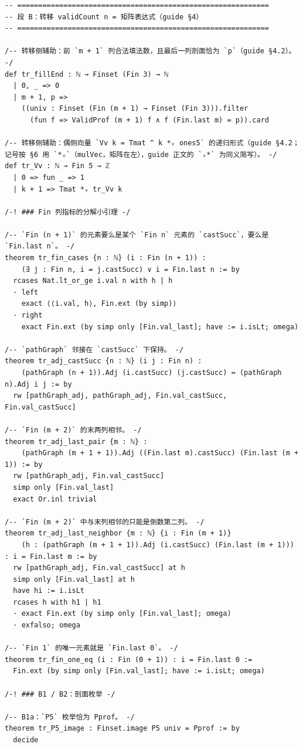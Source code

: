 \documentclass[11pt]{article}
\begin{document}
\begin{lstlisting}
-- ============================================================
-- 段 B：转移 validCount n = 矩阵表达式（guide §4）
-- ============================================================

/-- 转移侧辅助：前 `m + 1` 列合法填法数，且最后一列剖面恰为 `p`（guide §4.2）。 -/
def tr_fillEnd : ℕ → Finset (Fin 3) → ℕ
  | 0, _ => 0
  | m + 1, p =>
    ((univ : Finset (Fin (m + 1) → Finset (Fin 3))).filter
      (fun f => ValidProf (m + 1) f ∧ f (Fin.last m) = p)).card

/-- 转移侧辅助：偶侧向量 `Vv k = Tmat ^ k *ᵥ ones5` 的递归形式（guide §4.2；
记号按 §6 用 `*ᵥ`（mulVec，矩阵在左），guide 正文的 `ᵥ*` 为同义简写）。 -/
def tr_Vv : ℕ → Fin 5 → ℤ
  | 0 => fun _ => 1
  | k + 1 => Tmat *ᵥ tr_Vv k

/-! ### Fin 列指标的分解小引理 -/

/-- `Fin (n + 1)` 的元素要么是某个 `Fin n` 元素的 `castSucc`，要么是 `Fin.last n`。 -/
theorem tr_fin_cases {n : ℕ} (i : Fin (n + 1)) :
    (∃ j : Fin n, i = j.castSucc) ∨ i = Fin.last n := by
  rcases Nat.lt_or_ge i.val n with h | h
  · left
    exact ⟨⟨i.val, h⟩, Fin.ext (by simp)⟩
  · right
    exact Fin.ext (by simp only [Fin.val_last]; have := i.isLt; omega)

/-- `pathGraph` 邻接在 `castSucc` 下保持。 -/
theorem tr_adj_castSucc {n : ℕ} (i j : Fin n) :
    (pathGraph (n + 1)).Adj (i.castSucc) (j.castSucc) ↔ (pathGraph n).Adj i j := by
  rw [pathGraph_adj, pathGraph_adj, Fin.val_castSucc, Fin.val_castSucc]

/-- `Fin (m + 2)` 的末两列相邻。 -/
theorem tr_adj_last_pair {m : ℕ} :
    (pathGraph (m + 1 + 1)).Adj ((Fin.last m).castSucc) (Fin.last (m + 1)) := by
  rw [pathGraph_adj, Fin.val_castSucc]
  simp only [Fin.val_last]
  exact Or.inl trivial

/-- `Fin (m + 2)` 中与末列相邻的只能是倒数第二列。 -/
theorem tr_adj_last_neighbor {m : ℕ} {i : Fin (m + 1)}
    (h : (pathGraph (m + 1 + 1)).Adj (i.castSucc) (Fin.last (m + 1))) : i = Fin.last m := by
  rw [pathGraph_adj, Fin.val_castSucc] at h
  simp only [Fin.val_last] at h
  have hi := i.isLt
  rcases h with h1 | h1
  · exact Fin.ext (by simp only [Fin.val_last]; omega)
  · exfalso; omega

/-- `Fin 1` 的唯一元素就是 `Fin.last 0`。 -/
theorem tr_fin_one_eq (i : Fin (0 + 1)) : i = Fin.last 0 :=
  Fin.ext (by simp only [Fin.val_last]; have := i.isLt; omega)

/-! ### B1 / B2：剖面枚举 -/

/-- B1a：`P5` 枚举恰为 Pprof。 -/
theorem tr_P5_image : Finset.image P5 univ = Pprof := by
  decide


\end{lstlisting}
\end{document}
